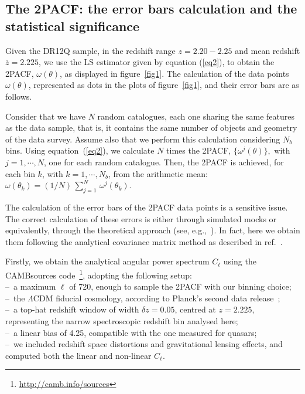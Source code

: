 \documentclass[a4paper,11pt]{article}
\begin{document}
\subsection{The 2PACF: the error bars calculation and the statistical significance}\label{errors}

Given the DR12Q sample, in the redshift range $z = 2.20 - 2.25$ and mean redshift 
$\overline{z}=2.225$, we use the LS estimator given by equation (\ref{eq2}), to obtain the 2PACF, 
$\omega(\theta)$, as displayed in figure~\ref{fig1}. 
The calculation of the data points  $\omega(\theta)$, represented as dots in the plots of 
figure~\ref{fig1}, and their error bars are as follows.

Consider that we have $N$ random catalogues, each one sharing the same features as the data sample, 
that is, it contains the same number of objects and geometry of the data survey. 
Assume also that we perform this calculation considering $N_b$ bins. 
Using equation~(\ref{eq2}), we calculate $N$ times the 2PACF, $\{ \omega^j(\theta) \},$ with $j=1, \cdots, N$, 
one for each random catalogue. 
Then, the 2PACF is achieved, for each bin $k$, with $k=1, \cdots, N_b$, from the arithmetic mean: 
$\omega(\theta_{k}) = (1/N) \, \sum_{j=1}^N \, \omega^j(\theta_{k})$. 

The calculation of the error bars of the 2PACF data points is a sensitive issue. 
The correct calculation of these errors is either through simulated mocks or equivalently, through the 
theoretical approach (see, e.g.,~\cite{Crocce11a,Crocce11b,Norberg,Friedrich}). 
In fact, here we obtain them following the analytical covariance matrix method as described in 
ref.~\cite{Crocce11b}. 

Firstly, we obtain the analytical angular power spectrum $C_{\ell}$ using the {\sc CAMBsources} 
code~\cite{Challinor}\footnote{\url{http://camb.info/sources}}, adopting the following setup: \\
--\, a maximum $\ell$ of 720, enough to sample the 2PACF with our binning choice; \\
--\, the $\Lambda$CDM fiducial cosmology, according to Planck's second data 
release~\cite{PLA-XIII}; \\
--\, a top-hat redshift window of width $\delta z = 0.05$, centred at $z=2.225$, representing the 
narrow spectroscopic redshift bin analysed here; \\
--\, a linear bias of 4.25, compatible with the one measured for quasars; \\
--\, we included redshift space distortions and gravitational lensing effects, and computed both the  
linear and non-linear $C_{\ell}$. 
\end{document}
